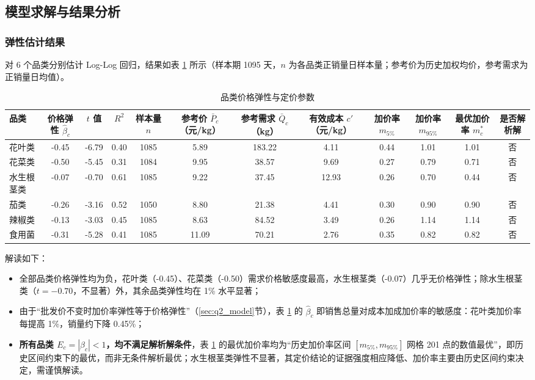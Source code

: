 \subsection{模型求解与结果分析}
\label{sec:result}

\subsubsection{弹性估计结果}

对 6 个品类分别估计 Log-Log 回归，结果如表 \ref{tab:q2_elasticity} 所示（样本期 1095 天，$n$ 为各品类正销量日样本量；参考价为历史加权均价，参考需求为正销量日均值）。

\begin{table}[htbp]
\centering
\caption{品类价格弹性与定价参数}
\label{tab:q2_elasticity}
\begin{tabular}{lccccccccccc}
\toprule
品类 & 价格弹性 $\hat\beta_c$ & $t$ 值 & $R^2$ & 样本量 $n$ & 参考价 $\bar P_c$（元/kg） & 参考需求 $\bar Q_c$（kg） & 有效成本 $c'$（元/kg） & 加价率 $m_{5\%}$ & 加价率 $m_{95\%}$ & 最优加价率 $m^*_c$ & 是否解析解 \\
\midrule
花叶类 & -0.45 & -6.79 & 0.40 & 1085 & 5.89 & 183.22 & 4.11 & 0.44 & 1.01 & 1.01 & 否 \\
花菜类 & -0.50 & -5.45 & 0.31 & 1084 & 9.95 & 38.57 & 9.69 & 0.27 & 0.79 & 0.71 & 否 \\
水生根茎类 & -0.07 & -0.70 & 0.61 & 1085 & 9.22 & 37.45 & 12.93 & 0.26 & 0.70 & 0.44 & 否 \\
茄类 & -0.26 & -3.16 & 0.52 & 1050 & 8.80 & 21.38 & 4.41 & 0.30 & 0.90 & 0.90 & 否 \\
辣椒类 & -0.13 & -3.03 & 0.45 & 1085 & 8.63 & 84.52 & 3.49 & 0.26 & 1.14 & 1.14 & 否 \\
食用菌 & -0.31 & -5.28 & 0.41 & 1085 & 11.09 & 70.21 & 2.76 & 0.35 & 0.82 & 0.82 & 否 \\
\bottomrule
\end{tabular}
\end{table}

解读如下：

\begin{itemize}
\item 全部品类价格弹性均为负，花叶类（-0.45）、花菜类（-0.50）需求价格敏感度最高，水生根茎类（-0.07）几乎无价格弹性；除水生根茎类（$t=-0.70$，不显著）外，其余品类弹性均在 1\% 水平显著；
\item 由于“批发价不变时加价率弹性等于价格弹性”（\ref{sec:q2_model}节），表 \ref{tab:q2_elasticity} 的 $\hat\beta_c$ 即销售总量对成本加成加价率的敏感度：花叶类加价率每提高 1\%，销量约下降 0.45\%；
\item \textbf{所有品类 $E_c=|\beta_c|<1$，均不满足解析解条件}，表 \ref{tab:q2_elasticity} 的最优加价率均为“历史加价率区间 $[m_{5\%},m_{95\%}]$ 网格 201 点的数值最优”，即历史区间约束下的最优，而非无条件解析最优；水生根茎类弹性不显著，其定价结论的证据强度相应降低、加价率主要由历史区间约束决定，需谨慎解读。
\end{itemize}


